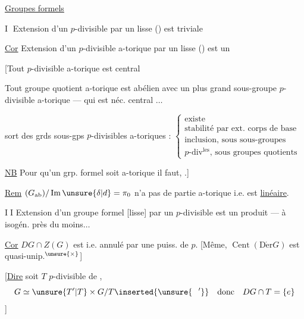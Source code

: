 \uline{Groupes formels}

\textcircled{I} Extension d'un $p$-divisible par un lisse () est triviale

\uline{Cor} Extension d'un $p$-divisible a-torique par un lisse ()
est un  

[Tout  $p$-divisible a-torique est central

Tout groupe quotient  a-torique est abélien avec un
plus grand sous-groupe $p$-divisible a-torique
--- qui est néc. central $\ldots$

 sort des  grds sous-gps $p$-divisibles
a-toriques :
$\left\{\begin{array}{l}
\text{existe}\\
\text{stabilité par ext. corps de base}\\
\text{inclusion, sous sous-groupes}\\
\text{$p$-div$^{\mathrm{les}}$, sous groupes quotients}
\end{array}\right.$

\uline{NB} Pour qu'un grp. formel soit a-torique il faut,
 .]

\uline{Rem} $(G_{\mathrm{ab}})/\operatorname{Im}\unsure{\delta|d}=\pi_0$ n'a pas de partie a-torique i.e. est \uline{linéaire}.


\textcircled{II} Extension d'un groupe formel [lisse] par un $p$-divisible est
\inserted{[si $G$ lisse]}  un produit --- à isogén. près du moins$\ldots$

\uline{Cor} $DG\cap Z(G)$ est  i.e. annulé par une
puiss. de $p$. [Même,  $\operatorname{Cent}(\operatorname{D\acute{e}r}G)$ est quasi-unip.$^{\unsure{\times}}$]

[\uline{Dire} soit  $T$  $p$-divisible de  ,  
\[
G\simeq\unsure{T'|T}\times G/T\inserted{\unsure{\phantom{T}'}}\quad
\text{donc}\quad DG\cap T=\{e\}
\]
]


